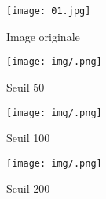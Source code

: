 \usepackage{}\documentclass[oneside]{book}
\begin{document}
\FloatBarrier
\begin{figure}[!htb]
   \begin{minipage}{0.5\textwidth}
     \centering
     \texttt{[image: 01.jpg]}
     \caption{Image originale}
   \end{minipage}\hfill
   \begin{minipage}{0.5\textwidth}
     \centering
     \texttt{[image: img/.png]}
     \caption{Seuil 50}
   \end{minipage}\hfill
   \begin{minipage}{0.5\textwidth}
     \centering
     \texttt{[image: img/.png]}
     \caption{Seuil 100}
   \end{minipage}
   \begin{minipage}{0.5\textwidth}
     \centering
     \texttt{[image: img/.png]}
     \caption{Seuil 200}
   \end{minipage}
\end{figure}
\FloatBarrier

  
\end{document}
